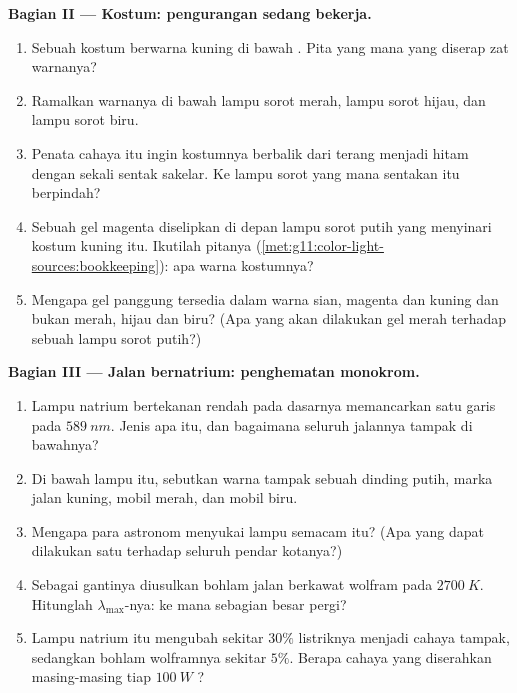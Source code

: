 \begin{problem}
\medskip
\noindent\textbf{Bagian II --- Kostum: pengurangan sedang bekerja.}
\begin{enumerate}[resume]
  \item Sebuah kostum berwarna kuning di bawah . Pita yang
        mana yang diserap zat warnanya?
  \item Ramalkan warnanya di bawah lampu sorot merah, lampu sorot
        hijau, dan lampu sorot biru.
  \item Penata cahaya itu ingin kostumnya berbalik dari terang menjadi
        hitam dengan sekali sentak sakelar. Ke lampu sorot yang mana
        sentakan itu berpindah?
  \item Sebuah gel magenta diselipkan di depan lampu sorot putih yang
        menyinari kostum kuning itu. Ikutilah pitanya
        (\cref{met:g11:color-light-sources:bookkeeping}): apa warna
        kostumnya?
  \item Mengapa gel panggung tersedia dalam warna sian, magenta dan
        kuning dan bukan merah, hijau dan biru? (Apa yang akan
        dilakukan gel merah terhadap  sebuah lampu sorot putih?)
\end{enumerate}

\medskip
\noindent\textbf{Bagian III --- Jalan bernatrium: penghematan monokrom.}
\begin{enumerate}[resume]
  \item Lampu natrium bertekanan rendah pada dasarnya memancarkan satu
        garis pada $\qty{589}{nm}$. Jenis  apa itu, dan
        bagaimana seluruh jalannya tampak di bawahnya?
  \item Di bawah lampu itu, sebutkan warna tampak sebuah dinding putih,
        marka jalan kuning, mobil merah, dan mobil biru.
  \item Mengapa para astronom menyukai lampu semacam itu? (Apa yang
        dapat dilakukan satu  terhadap seluruh pendar kotanya?)
  \item Sebagai gantinya diusulkan bohlam jalan berkawat wolfram pada
        $\qty{2700}{K}$. Hitunglah $\lambda_{\max}$-nya: ke mana
        sebagian besar  pergi?
  \item Lampu natrium itu mengubah sekitar $30\%$  listriknya
        menjadi cahaya tampak, sedangkan bohlam wolframnya sekitar
        $5\%$. Berapa  cahaya yang diserahkan masing-masing tiap
        $\qty{100}{W}$ ?
\end{enumerate}


\end{problem}
